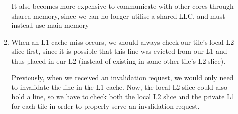 \begin{enumerate}[label=(\alph*)]
\begin{enumerate}[label=(\roman*)]
                It also becomes more expensive to communicate with other cores through shared memory, since we can no longer utilise a shared LLC, and must instead use main memory.

            \item
                When an L1 cache miss occurs, we should always check our tile's local L2 slice first, since it is possible that this line was evicted from our L1 and thus placed in our L2 (instead of existing in some other tile's L2 slice).

                Previously, when we received an invalidation request, we would only need to invalidate the line in the L1 cache. Now, the local L2 slice could also hold a line, so we have to check both the local L2 slice and the private L1 for each tile in order to properly serve an invalidation request.

            
        \end{enumerate}

        
\end{enumerate}

